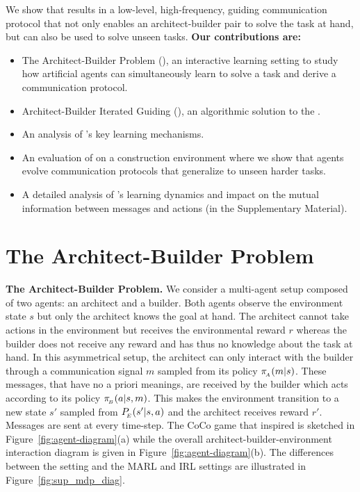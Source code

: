 We show that \abig results in a low-level, high-frequency, guiding communication protocol that not only enables an architect-builder pair to solve the task at hand, but can also be used to solve unseen tasks.
\textbf{Our contributions are:} 
\begin{itemize}[noitemsep]
    \item The %
    Architect-Builder Problem (\abp), an interactive learning setting to study how %
    artificial agents can simultaneously learn to solve a task and derive a communication protocol. 
    \item Architect-Builder Iterated Guiding (\abig), an algorithmic solution to the \abp. 
    \item An analysis of \abig's key learning mechanisms. 
    \item An evaluation of \abig on a construction environment where we show that \abig agents evolve communication protocols that generalize to unseen harder tasks.
    \item A detailed analysis of \abig's learning dynamics and impact on the mutual information between messages and actions (in the Supplementary Material). 
\end{itemize}


\section{The Architect-Builder Problem}

\label{sec:prob_def}
\textbf{The Architect-Builder Problem. } We consider a multi-agent setup composed of two agents: an architect and a builder. Both agents observe the environment state $s$ but only the architect knows the goal at hand. The architect cannot take actions in the environment but receives the environmental reward $r$ whereas the builder does not receive any reward and has thus no knowledge about the task at hand. In this asymmetrical setup, the architect can only interact with the builder through a communication signal $m$ sampled from its policy $\pi_{\!_A}(m|s)$. These messages, that have no a priori meanings, are received by the builder which acts according to its policy $\pi_{\!_B}(a|s,m)$. This makes the environment transition to a new state $s'$ sampled from $P_{\!_E}(s'|s,a)$ and the architect receives reward $r'$. Messages are sent at every time-step. The CoCo game that inspired \abp is sketched in Figure~\ref{fig:agent-diagram}(a) while the overall architect-builder-environment interaction diagram is given in Figure~\ref{fig:agent-diagram}(b). The differences between the \abp setting and the MARL and IRL settings are illustrated in Figure~\ref{fig:sup_mdp_diag}.

